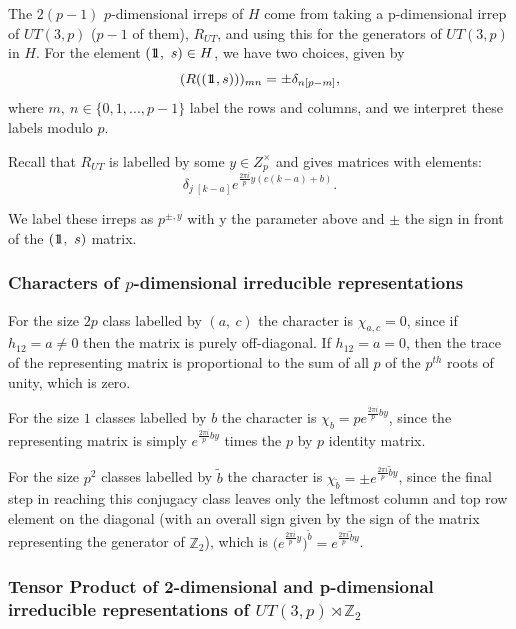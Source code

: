 \documentclass[12pt]{article}
\theoremstyle{definition}
\def\identity{{\rlap{1} \hskip 1.6pt \hbox{1}}}
\begin{document}
The $2(p-1)$ $p$-dimensional irreps of $H$ come from taking a p-dimensional irrep of $UT(3,p)$ ($p-1$ of them), $R_{UT}$, and using this for the generators of $UT(3,p)$ in $H$. For the element $(\identity,~s) \in H$, we have two choices, given by
\begin{equation}
(R((\identity,s)))_{mn} = \pm \delta_{n[p-m]},
\end{equation}
where $m,~n \in \{0,1,...,p-1 \}$ label the rows and columns, and we interpret these labels modulo $p$.

Recall that $R_{UT}$ is labelled by some $y \in Z_p^{\times}$ and gives matrices with elements:
\begin{equation}
\delta_{j \; [k - a]} e^{\frac{2 \pi i}{p} y (c(k-a)+b)}.
\end{equation}

We label these irreps as $p^{\pm,y}$ with y the parameter above and $\pm$ the sign in front of the $(\identity,~s)$ matrix.

\subsubsection*{Characters of $p$-dimensional irreducible representations}

For the size $2p$ class labelled by $(a,~c)$ the character is $\chi_{a,c} = 0$, since if $h_{12} = a \neq 0$ then the matrix is purely off-diagonal. If $h_{12} = a = 0$, then the trace of the representing matrix is proportional to the sum of all $p$ of the $p^{th}$ roots of unity, which is zero.

For the size $1$ classes labelled by $b$ the character is $\chi_b = pe^{\frac{2 \pi i}{p} b y}$, since the representing matrix is simply $e^{\frac{2 \pi i}{p} b y}$ times the $p$ by $p$ identity matrix.

For the size $p^2$ classes labelled by $\tilde{b}$ the character is $\chi_{\tilde{b}} = \pm e^{\frac{2 \pi i}{p} \tilde{b} y}$, since the final step in reaching this conjugacy class leaves only the leftmost column and top row element on the diagonal (with an overall sign given by the sign of the matrix representing the generator of $\mathbb{Z}_2$), which is $\big(e^{\frac{2 \pi i}{p} y}\big)^{\tilde{b}} = e^{\frac{2 \pi i}{p} \tilde{b} y}$.

\subsubsection*{Tensor Product of 2-dimensional and p-dimensional irreducible representations of $UT(3,p) \rtimes \mathbb{Z}_2$}
\end{document}
